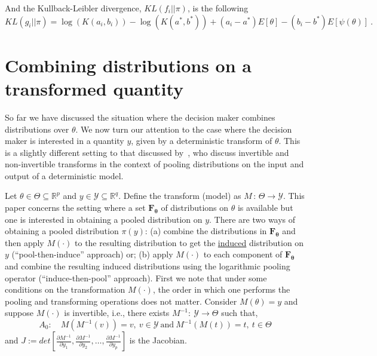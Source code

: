 \documentclass[a4paper, notitlepage, 10pt]{article}
\begin{document}
And the Kullback-Leibler divergence, $KL(f_i || \pi)$, is the following
\begin{equation}
\label{eq:KLpriorEF}
KL(g_i || \pi) = \log( K(a_i,b_i)) - \log(K(a^*,b^*)) + (a_i - a^*) E[\theta] - (b_i - b^*) E[\psi(\theta)] \: .
\end{equation}
{\color{red}
\section*{Combining distributions on a transformed quantity} %
So far we have discussed the situation where the decision maker combines distributions over $\theta$.
We now turn our attention to the case where the decision maker is interested in a quantity $y$, given by a deterministic transform of $\theta$.
This is a slightly different setting to that discussed by~\cite{poole2000}, who discuss invertible and non-invertible transforms in the context of pooling distributions on the input and output of a deterministic model.

Let $\theta \in \Theta \subseteq \mathbb{R}^p$ and $y \in \mathcal{Y} \subseteq \mathbb{R}^q$. 
Define the transform (model) as $M \,:\, \Theta \to \mathcal{Y}$. 
This paper concerns the setting where a set $\mathbf{F_\theta}$ of distributions on $\theta$ is available but one is interested in obtaining a pooled distribution on $y$.
There are two ways of obtaining a pooled distribution $\pi(y)$: (a) combine the distributions in $\mathbf{F_\theta}$ and then apply $M(\cdot)$ to the resulting distribution to get the \underline{induced} distribution on $y$ (``pool-then-induce'' approach) or; (b) apply  $M(\cdot)$ to each component of $\mathbf{F_\theta}$ and combine the resulting induced distributions using the logarithmic pooling operator (``induce-then-pool'' approach). 
First we note that under some conditions on the transformation $M(\cdot)$, the order in which one performs the pooling and transforming operations does not matter.
Consider $M(\theta) = y$ and suppose $M(\cdot)$ is invertible, i.e., there exists $M^{-1}: \: \mathcal{Y} \to \Theta$ such that,
\[A_0:\quad M(M^{-1}(v)) = v,\: v \in \mathcal{Y}\: \text{and}\: M^{-1}(M(t)) = t, \: t \in \Theta \]
and $J := det \left[ \frac{\partial M^{-1}}{\partial y_1}, \frac{\partial M^{-1}}{\partial y_2}, \ldots, \frac{\partial M^{-1}}{\partial y_p}\right]$ is the Jacobian.

}
\end{document}
